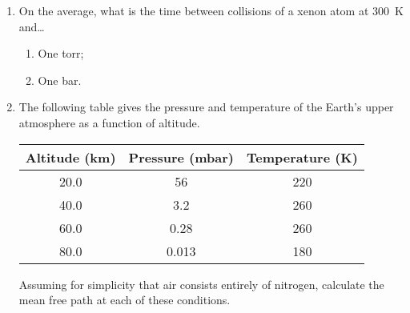 \documentclass[../psets.tex]{subfiles}
\begin{document}
\begin{enumerate}[label={\textbf{27-\arabic*.}},leftmargin=3.5em]
\begin{proof}[Answer]
\begin{figure}[h!]
\begin{subfigure}[b]{0.3\linewidth}
                \caption{3}
            \end{subfigure}
        \end{figure}
    \end{proof}
    \setcounter{enumi}{35}
    \item On the average, what is the time between collisions of a xenon atom at \SI{300}{\kelvin} and\dots
    \begin{enumerate}
        \item One torr;
        \item One bar.
    \end{enumerate}
    \setcounter{enumi}{39}
    \item The following table gives the pressure and temperature of the Earth's upper atmosphere as a function of altitude.
    \begin{center}
        \small
        \renewcommand{\arraystretch}{1.2}
        \begin{tabular}{ccc}
            Altitude (\si{\kilo\meter}) & Pressure (\si{\milli\bar}) & Temperature (\si{\kelvin})\\
            \hline
            20.0 & 56 & 220\\
            40.0 & 3.2 & 260\\
            60.0 & 0.28 & 260\\
            80.0 & 0.013 & 180\\
        \end{tabular}
    \end{center}
    Assuming for simplicity that air consists entirely of nitrogen, calculate the mean free path at each of these conditions.
\end{enumerate}
\end{document}
